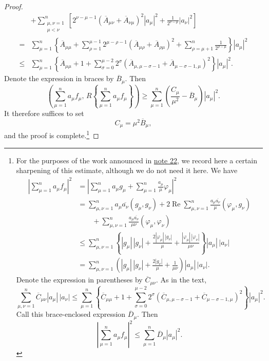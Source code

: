 ﻿\documentclass[paper=b5,fontsize=13pt,bookmarkpackage=false,twoside]{scrartcl}
\begin{document}
\begin{proof}
\begin{align*}
&+\sum_{\substack{\mu,\nu=1\\\mu<\nu}}^{n}
\left[
2^{\nu-\mu-1}
(\overline A_{\mu\nu}+\overline A_{\nu\mu})^2|a_\mu|^2
+\frac{1}{2^{\nu-\mu}}|a_\nu|^2
\right]\\
={}&
\sum_{\mu=1}^{n}
\left\{
\overline A_{\mu\mu}
+\sum_{\rho=1}^{\mu-1}
2^{\mu-\rho-1}
(\overline A_{\mu\rho}+\overline A_{\rho\mu})^2
+\sum_{\rho=\mu+1}^{n}\frac{1}{2^{\rho-\mu}}
\right\}|a_\mu|^2\\
\le{}&
\sum_{\mu=1}^{n}
\left\{
\overline A_{\mu\mu}+1
+\sum_{\sigma=0}^{\mu-2}
2^\sigma
(\overline A_{\mu,\mu-\sigma-1}
 +\overline A_{\mu-\sigma-1,\mu})^2
\right\}|a_\mu|^2.
\end{align*}
Denote the expression in braces by $\overline B_\mu$. Then
\[
\left(\sum_{\mu=1}^{n}a_\mu f_\mu,\,
R\left\{\sum_{\mu=1}^{n}a_\mu f_\mu\right\}\right)
\ge
\sum_{\mu=1}^{n}
\left(\frac{C_\mu}{\mu^2}-\overline B_\mu\right)|a_\mu|^2.
\]
It therefore suffices to set
\[
C_\mu=\mu^2\overline B_\mu,
\]
and the proof is complete.\footnote{\label{fn:60}For the purposes of the work announced in \hyperref[fn:source-22]{note 22}, we record here a certain sharpening of this estimate, although we do not need it here. We have
\begin{align*}
\left|\sum_{\mu=1}^{n}a_\mu f_\mu\right|^2
&=
\left|
\sum_{\mu=1}^{n}a_\mu g_\mu
+\sum_{\mu=1}^{n}\frac{a_\mu}{\mu}\varphi_\mu
\right|^2\\
&=
\sum_{\mu,\nu=1}^{n}
a_\mu\overline{a_\nu}(g_\mu,g_\nu)
+2\operatorname{Re}\sum_{\mu,\nu=1}^{n}
\frac{a_\mu\overline{a_\nu}}{\mu}(\varphi_\mu,g_\nu)\\
&\qquad
+\sum_{\mu,\nu=1}^{n}
\frac{a_\mu\overline{a_\nu}}{\mu\nu}
(\varphi_\mu,\varphi_\nu)\\
&\le
\sum_{\mu,\nu=1}^{n}
\left\{
|g_\mu|\,|g_\nu|
+\frac{2|\varphi_\mu|\,|g_\nu|}{\mu}
+\frac{|\varphi_\mu|\,|\varphi_\nu|}{\mu\nu}
\right\}
|a_\mu|\,|a_\nu|\\
&=
\sum_{\mu,\nu=1}^{n}
\left(
|g_\mu|\,|g_\nu|
+\frac{2|g_\nu|}{\mu}
+\frac{1}{\mu\nu}
\right)
|a_\mu|\,|a_\nu|.
\end{align*}
Denote the expression in parentheses by $\overline C_{\mu\nu}$. As in the text,
\[
\sum_{\mu,\nu=1}^{n}
\overline C_{\mu\nu}|a_\mu|\,|a_\nu|
\le
\sum_{\mu=1}^{n}
\left\{
\overline C_{\mu\mu}+1
+\sum_{\sigma=0}^{\mu-2}
2^\sigma
(\overline C_{\mu,\mu-\sigma-1}
 +\overline C_{\mu-\sigma-1,\mu})^2
\right\}|a_\mu|^2.
\]
Call this brace-enclosed expression $\overline D_\mu$. Then
\[
\left|\sum_{\mu=1}^{n}a_\mu f_\mu\right|^2
\le\sum_{\mu=1}^{n}\overline D_\mu|a_\mu|^2.
\]}
\end{proof}
\end{document}
